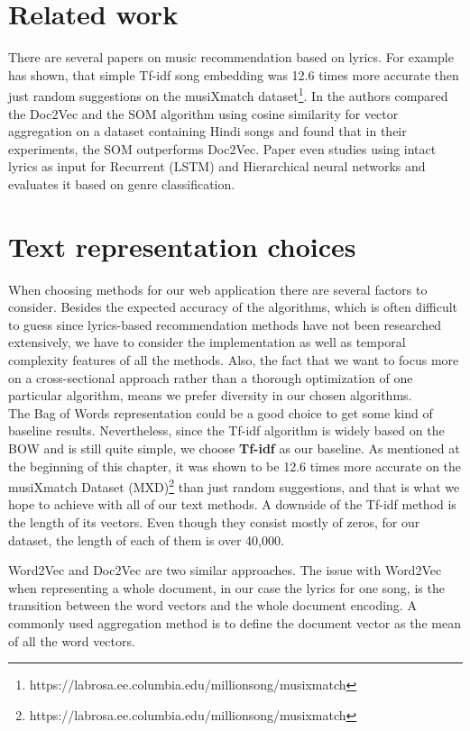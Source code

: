 \section{Related work}\label{sec:text_related_work}

 There are several papers on music recommendation based on lyrics. For example \cite{Gossi2016LyricBasedMR} has shown, that simple Tf-idf song embedding was 12.6 times more accurate then just random suggestions on the musiXmatch dataset\footnote{https://labrosa.ee.columbia.edu/millionsong/musixmatch}.  In \cite{inproceedings} the authors compared the Doc2Vec and the SOM algorithm using cosine similarity for vector aggregation on a dataset containing Hindi songs and found that in their experiments, the SOM outperforms Doc2Vec. Paper \cite{DBLP:journals/corr/Tsaptsinos17} even studies using intact lyrics as input for Recurrent (LSTM) and Hierarchical neural networks and evaluates it based on genre classification.

\section{Text representation choices}
When choosing methods for our web application there are several factors to consider. Besides the expected accuracy of the algorithms, which is often difficult to guess since lyrics-based recommendation methods have not been researched extensively, we have to consider the implementation as well as temporal complexity features of all the methods. Also, the fact that we want to focus more on a cross-sectional approach rather than a thorough optimization of one particular algorithm, means we prefer diversity in our chosen algorithms.  \\

The Bag of Words representation could be a good choice to get some kind of baseline results. Nevertheless, since the Tf-idf algorithm is widely based on the BOW and is still quite simple, we choose \textbf{Tf-idf} as our baseline. As mentioned at the beginning of this chapter, it was shown to be 12.6 times more accurate on the musiXmatch Dataset (MXD)\footnote{https://labrosa.ee.columbia.edu/millionsong/musixmatch} than just random suggestions, and that is what we hope to achieve with all of our text methods. A downside of the Tf-idf method is the length of its vectors. Even though they consist mostly of zeros, for our dataset, the length of each of them is over 40,000. 

Word2Vec and Doc2Vec are two similar approaches. The issue with Word2Vec when representing a whole document, in our case the lyrics for one song, is the transition between the word vectors and the whole document encoding. A commonly used aggregation method is to define the document vector as the mean of all the word vectors. 

